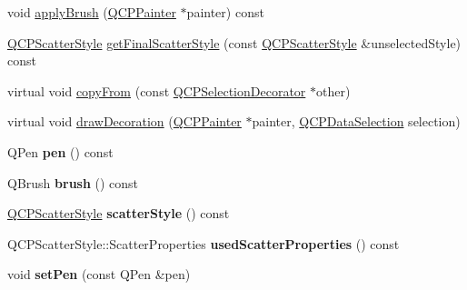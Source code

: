 \begin{DoxyCompactItemize}
\item 
void \hyperlink{class_q_c_p_selection_decorator_a225544527d51b49546b70d0e6d655a34}{apply\+Brush} (\hyperlink{class_q_c_p_painter}{Q\+C\+P\+Painter} $\ast$painter) const
\item 
\hyperlink{class_q_c_p_scatter_style}{Q\+C\+P\+Scatter\+Style} \hyperlink{class_q_c_p_selection_decorator_a1277b373248896bc70e8cc1de96da9fa}{get\+Final\+Scatter\+Style} (const \hyperlink{class_q_c_p_scatter_style}{Q\+C\+P\+Scatter\+Style} \&unselected\+Style) const
\item 
virtual void \hyperlink{class_q_c_p_selection_decorator_a467a8d5cfcab27e862a17c797ac27b8a}{copy\+From} (const \hyperlink{class_q_c_p_selection_decorator}{Q\+C\+P\+Selection\+Decorator} $\ast$other)
\item 
virtual void \hyperlink{class_q_c_p_selection_decorator_a4f8eb49e277063845391e803ae23054a}{draw\+Decoration} (\hyperlink{class_q_c_p_painter}{Q\+C\+P\+Painter} $\ast$painter, \hyperlink{class_q_c_p_data_selection}{Q\+C\+P\+Data\+Selection} selection)
\item 
\mbox{\label{class_q_c_p_selection_decorator_a9307a60c9759223367909aed2d05ad91}} 
Q\+Pen {\bfseries pen} () const
\item 
\mbox{\label{class_q_c_p_selection_decorator_a783b643aa52120a25308fc501b9998b1}} 
Q\+Brush {\bfseries brush} () const
\item 
\mbox{\label{class_q_c_p_selection_decorator_aa6558f6f270a188bb633386aba0d1ae4}} 
\hyperlink{class_q_c_p_scatter_style}{Q\+C\+P\+Scatter\+Style} {\bfseries scatter\+Style} () const
\item 
\mbox{\label{class_q_c_p_selection_decorator_ab2019bf31dde39f1ec028e3810dfc08b}} 
Q\+C\+P\+Scatter\+Style\+::\+Scatter\+Properties {\bfseries used\+Scatter\+Properties} () const
\item 
\mbox{\label{class_q_c_p_selection_decorator_ac2c8192e1e294aa3a4a7f32a859e3d76}} 
void {\bfseries set\+Pen} (const Q\+Pen \&pen)
\item 
\mbox{\label{class_q_c_p_selection_decorator_aa74b626be518ea17055f918d423c8c2d}} 

\end{DoxyCompactItemize}
